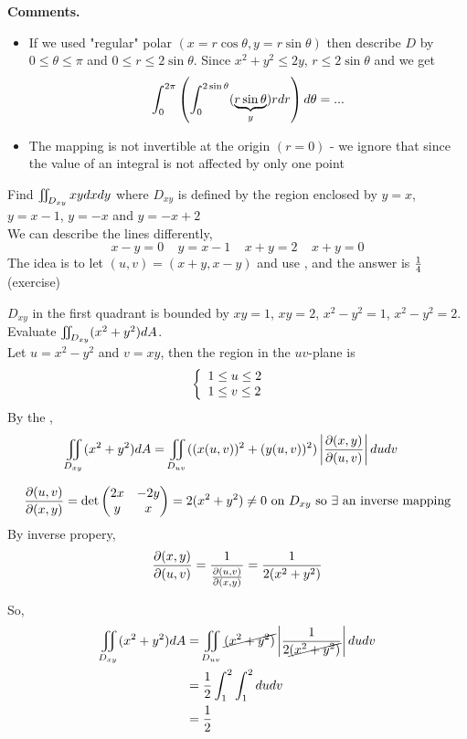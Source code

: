 \documentclass[english, 11pt]{article}
\begin{document}
\textbf{Comments.}

\begin{itemize}
  \item If we used "regular" polar $(x = r\cos\theta, y = r\sin\theta)$ then describe $D$ by $0 \leq \theta \leq \pi$ and $0 \leq r \leq 2\sin\theta$. Since $x^2 + y^2 \leq 2y$, $r \leq 2\sin\theta$ and we get
  \[ \int_0^{2\pi} \left( \int_0^{2\sin\theta} (\underbrace{r\sin\theta}_y) r dr \right) d\theta = ... \]
  \item The mapping is not invertible at the origin $(r = 0)$ - we ignore that since the value of an integral is not affected by only one point
\end{itemize}

\begin{exmp}
  Find $\iint\displaylimits_{D_{xy}} xydxdy$ where $D_{xy}$ is defined by the region enclosed by $y = x$, $y = x-1$, $y = -x$ and $y = -x + 2$ \\

  We can describe the lines differently,
  \[ x - y = 0 \ \ \ \ \ y = x - 1 \ \ \ \ \ x + y = 2 \ \ \ \ \ x + y = 0 \]
  The idea is to let $(u,v) = (x+y, x-y)$ and use , and the answer is $\frac{1}{4}$ (exercise)
\end{exmp}

\begin{exmp}
  $D_{xy}$ in the first quadrant is bounded by $xy = 1$, $xy = 2$, $x^2 - y^2 = 1$, $x^2 - y^2 = 2$. Evaluate $\iint\displaylimits_{D_{xy}} (x^2 + y^2) dA$. \\

  Let $u = x^2 - y^2$ and $v = xy$, then the region in the $uv$-plane is
  \[ \left\{ \begin{array}{lr} 1 \leq u \leq 2 & \mbox{} \\ 1 \leq v \leq 2 & \mbox{} \end{array} \right. \]
  By the ,
  \begin{align*}
    \iint\displaylimits_{D_{xy}} (x^2 + y^2) dA & = \iint\displaylimits_{D_{uv}} ((x(u,v))^2 + (y(u,v))^2) \left| \frac{\partial(x,y)}{\partial(u,v)} \right| du dv
  \end{align*}
  \begin{note}
    \[ \frac{\partial(u,v)}{\partial(x,y)} = \det \left( \begin{matrix} 2x & -2y \\ y & x \end{matrix} \right) = 2(x^2 + y^2) \not = 0 \mbox{\ on $D_{xy}$ so $\exists$ an inverse mapping}  \]
    By inverse propery,
    \[ \frac{\partial(x,y)}{\partial(u,v)} = \frac{1}{\frac{\partial(u,v)}{\partial(x,y)}} = \frac{1}{2(x^2 + y^2)} \]
  \end{note}
  So,
  \begin{align*}
    \iint\displaylimits_{D_{xy}} (x^2 + y^2) dA & = \iint\displaylimits_{D_{uv}} \cancel{(x^2 + y^2)} \left| \frac{1}{2\cancel{(x^2+y^2)}} \right| du dv \\
    & = \frac{1}{2}\int_1^2\int_1^2 dudv \\
    & = \frac{1}{2}
  \end{align*}
\end{exmp}
\end{document}

